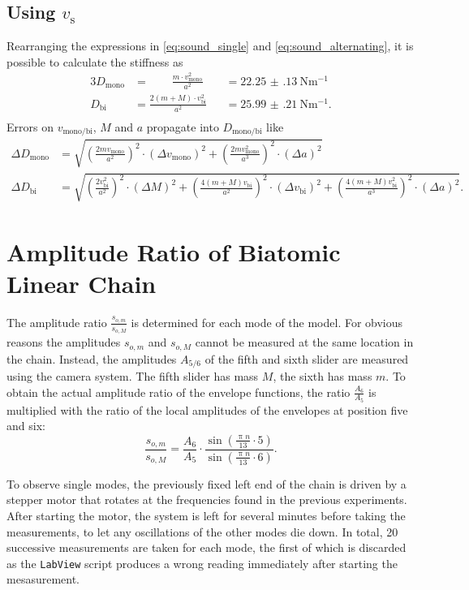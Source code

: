\subsection{Using $v_\text{s}$}
Rearranging the expressions in \ref{eq:sound_single} and \ref{eq:sound_alternating}, it is possible to calculate the stiffness as
\begin{alignat*}{3}
	D_\text{mono} &=\qquad \frac{m\cdot v_\text{mono}^2}{a^2} &&=  \SI{22.25(13)}{\newton\meter^{-1}} \\
	D_\text{bi} &= \frac{2(m+M)\cdot v_\text{bi}^2}{a^2} &&= \SI{25.99(21)}{\newton\meter^{-1}}. \\
\end{alignat*}
Errors on $v_\text{mono/bi}$, $M$ and $a$ propagate into $D_\text{mono/bi}$ like
\begin{align*}
	\Delta D_\text{mono} &= \sqrt{ \left(\frac{2mv_\text{mono}}{a^2}\right)^2 \cdot(\Delta v_\text{mono})^2 + \left(\frac{2mv_\text{mono}^2}{a^3}\right)^2 \cdot (\Delta a)^2 } \\
	\Delta D_\text{bi} &= \sqrt{ \left(\frac{2v_\text{bi}^2}{a^2}\right)^2 \cdot (\Delta M)^2
	+ \left(\frac{4(m+M)v_\text{bi}}{a^2}\right)^2 \cdot (\Delta v_\text{bi})^2
	+ \left(\frac{4(m+M)v_\text{bi}^2}{a^3}\right)^2 \cdot (\Delta a)^2 }.
\end{align*}

\section{Amplitude Ratio of Biatomic Linear Chain}
The amplitude ratio $\frac{s_{o,m}}{s_{o,M}}$ is determined for each mode of the model.
For obvious reasons the amplitudes $s_{o,m}$ and $s_{o,M}$ cannot be measured at the same location in the chain.
Instead, the amplitudes $A_{5/6}$ of the fifth and sixth slider are measured using the camera system.
The fifth slider has mass $M$, the sixth has mass $m$.
To obtain the actual amplitude ratio of the envelope functions, the ratio $\frac{A_{6}}{A_{5}}$ is multiplied with the ratio of the local amplitudes of the envelopes at position five and six:
\begin{equation*}
	\frac{s_{o,m}}{s_{o,M}} = \frac{A_{6}}{A_{5}} \cdot \frac{\sin(\frac{\uppi n}{13} \cdot 5)}{\sin(\frac{\uppi n}{13} \cdot 6)}.
\end{equation*}

To observe single modes, the previously fixed left end of the chain is driven by a stepper motor that rotates at the frequencies found in the previous experiments.
After starting the motor, the system is left for several minutes before taking the measurements, to let any oscillations of the other modes die down.
In total, 20 successive measurements are taken for each mode, the first of which is discarded as the \texttt{LabView} script produces a wrong reading immediately after starting the mesasurement.

